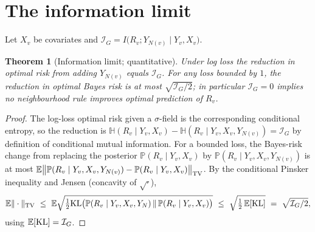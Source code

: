 \documentclass[11pt]{article}
\theoremstyle{plain}
\newtheorem{theorem}{Theorem}\newtheorem{proposition}{Proposition}\newtheorem{corollary}{Corollary}
\theoremstyle{definition}\newtheorem{assumption}{Assumption}\newtheorem{remark}{Remark}
\newcommand{\Pf}{\mathbb{P}}\newcommand{\I}{\mathbb{1}}\newcommand{\HH}{\mathbb{H}}\newcommand{\TV}{\mathrm{TV}}
\begin{document}
\section{The information limit}\label{sec:info}
Let $X_v$ be covariates and $\mathcal I_G=I\!\big(R_v;Y_{N(v)}\mid Y_v,X_v\big)$.
\begin{theorem}[Information limit; quantitative]\label{thm:info}
Under log loss the reduction in optimal risk from adding $Y_{N(v)}$ equals $\mathcal I_G$. For \emph{any} loss
bounded by $1$, the reduction in optimal Bayes risk is at most $\sqrt{\mathcal I_G/2}$; in particular
$\mathcal I_G=0$ implies no neighbourhood rule improves optimal prediction of $R_v$.
\end{theorem}
\begin{proof}
The log-loss optimal risk given a $\sigma$-field is the corresponding conditional entropy, so the reduction is
$\HH(R_v\mid Y_v,X_v)-\HH(R_v\mid Y_v,X_v,Y_{N(v)})=\mathcal I_G$ by definition of conditional mutual information.
For a bounded loss, the Bayes-risk change from replacing the posterior $\Pf(R_v\mid Y_v,X_v)$ by
$\Pf(R_v\mid Y_v,X_v,Y_{N(v)})$ is at most $\E\big\|\Pf(R_v\mid Y_v,X_v,Y_{N(v)})-\Pf(R_v\mid Y_v,X_v)\big\|_\TV$.
By the conditional Pinsker inequality and Jensen (concavity of $\sqrt{\cdot}$),
\[
   \E\|\cdot\|_\TV\ \le\ \E\sqrt{\tfrac12\mathrm{KL}\big(\Pf(R_v\mid Y_v,X_v,Y_N)\,\|\,\Pf(R_v\mid Y_v,X_v)\big)}
   \ \le\ \sqrt{\tfrac12\,\E[\mathrm{KL}]}\ =\ \sqrt{\mathcal I_G/2},
\]
using $\mathbb{E}[\mathrm{KL}]=\mathcal I_G$.
\end{proof}
\end{document}
